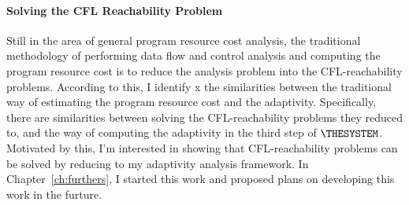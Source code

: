 \paragraph*{Solving the CFL Reachability Problem}
Still in the area of general program resource cost analysis,
the traditional methodology of performing data flow and control analysis and 
computing the program resource cost is
to reduce the analysis problem into the CFL-reachability problems.
According to this, 
I identify x
the similarities between the traditional way of estimating the program resource cost and 
the adaptivity.
Specifically, there are similarities between solving the CFL-reachability problems they reduced to,
 and the way of computing the adaptivity in 
the third step of $\THESYSTEM$.
 Motivated by this, 
 I'm interested in showing that
 CFL-reachability problems can be solved by reducing to my adaptivity analysis framework.
In Chapter~\ref{ch:furthers}, I started this work and proposed plans on developing this work in the furture.




